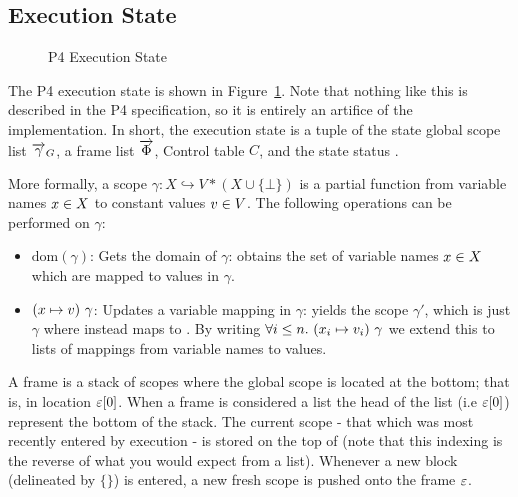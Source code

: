 \documentclass[UTF8]{article}
\begin{document}
\subsection{Execution State}

\begin{figure}[h!]
\centering\ottgrammartabular{
\ottstatus\ottinterrule
\ottstate\ottafterlastrule
}
\caption{P4 Execution State}  %
\label{fig:status}
\end{figure}

The P4 execution state is shown in Figure~\ref{fig:status}. Note that nothing like this is described in the P4 specification, so it is entirely an artifice of the \pfott{} implementation. In short, the execution state \exstate{} is a tuple of the state global scope list $\overrightarrow{\gamma}_G$, a frame list $\overrightarrow{\Phi}$, Control table $C$, and the state status \status{}. 


More formally, a scope $\gamma : X \hookrightarrow V * (X \cup \{ \bot \} )$ is a partial function from variable names $x{} \in X$ to constant values $v{} \in V$. The following operations can be performed on $\gamma$:
\begin{itemize}
\item $\mathrm{dom} ( \gamma )$: Gets the domain of $\gamma$: obtains the set of variable names $x{} \in X$ which are mapped to values in $\gamma$.
\item $(x \mapsto  v) \,\, \gamma$: Updates a variable mapping in $\gamma$: yields the scope $\gamma'$, which is just $\gamma$ where \vn{} instead maps to \cval{}. By writing $\forall i \leq n. \,\, ({x}_i \mapsto  {\ensuremath{v}}_i) \,\, \gamma$ we extend this to lists of mappings from variable names to values.
\end{itemize}

A frame \currsf{} is a stack of scopes where the global scope \gscope{} is located at the bottom; that is, in location $\varepsilon [0]$.
When a frame is considered a list the head of the list (i.e $\varepsilon{} [0]$) represent the bottom of the stack.
The current scope - that which was most recently entered by execution - is stored on the top of \currsf{}  (note that this indexing is the reverse of what you would expect from a list). Whenever a new block (delineated by $\{ \}$) is entered, a new fresh scope \escope{} is pushed onto the frame $\varepsilon$. %
\end{document}
